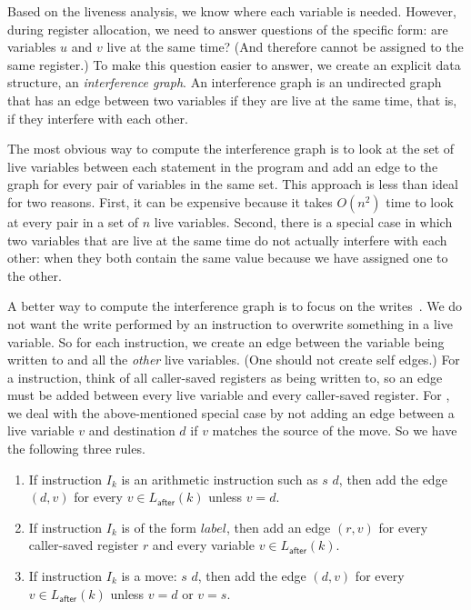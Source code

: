 \documentclass[11pt]{book}
\begin{document}
Based on the liveness analysis, we know where each variable is needed.
However, during register allocation, we need to answer questions of
the specific form: are variables $u$ and $v$ live at the same time?
(And therefore cannot be assigned to the same register.)  To make this
question easier to answer, we create an explicit data structure, an
\emph{interference graph}.  An interference graph is an undirected
graph that has an edge between two variables if they are live at the
same time, that is, if they interfere with each other.

The most obvious way to compute the interference graph is to look at
the set of live variables between each statement in the program and
add an edge to the graph for every pair of variables in the same set.
This approach is less than ideal for two reasons. First, it can be
expensive because it takes $O(n^2)$ time to look at every pair in a
set of $n$ live variables. Second, there is a special case in which
two variables that are live at the same time do not actually interfere
with each other: when they both contain the same value because we have
assigned one to the other.

A better way to compute the interference graph is to focus on the
writes~\cite{Appel:2003fk}. We do not want the write performed by an
instruction to overwrite something in a live variable. So for each
instruction, we create an edge between the variable being written to
and all the \emph{other} live variables.  (One should not create self
edges.) For a  instruction, think of all caller-saved
registers as being written to, so an edge must be added between every
live variable and every caller-saved register. For , we deal
with the above-mentioned special case by not adding an edge between a
live variable $v$ and destination $d$ if $v$ matches the source of the
move. So we have the following three rules.

\begin{enumerate}
\item If instruction $I_k$ is an arithmetic instruction such as
   $s$\key{,} $d$, then add the edge $(d,v)$ for every $v \in
  L_{\mathsf{after}}(k)$ unless $v = d$.

\item If instruction $I_k$ is of the form 
  $\mathit{label}$, then add an edge $(r,v)$ for every caller-saved
  register $r$ and every variable $v \in L_{\mathsf{after}}(k)$.

\item If instruction $I_k$ is a move:  $s$\key{,} $d$, then add
  the edge $(d,v)$ for every $v \in L_{\mathsf{after}}(k)$ unless $v =
  d$ or $v = s$.
\end{enumerate}
\end{document}
